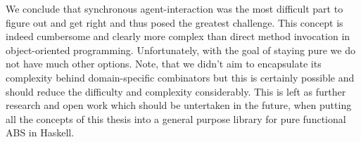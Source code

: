 We conclude that synchronous agent-interaction was the most difficult part to figure out and get right and thus posed the greatest challenge. This concept is indeed cumbersome and clearly more complex than direct method invocation in object-oriented programming. Unfortunately, with the goal of staying pure we do not have much other options. Note, that we didn't aim to encapsulate its complexity behind domain-specific combinators but this is certainly possible and should reduce the difficulty and complexity considerably. This is left as further research and open work which should be untertaken in the future, when putting all the concepts of this thesis into a general purpose library for pure functional ABS in Haskell.

